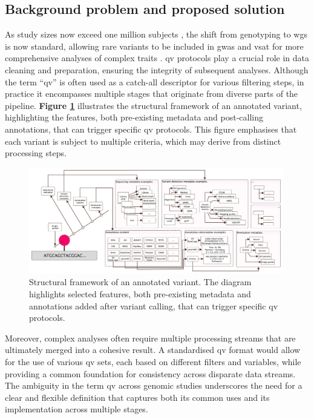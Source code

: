 \subsection{Background problem and proposed solution}

As study sizes now exceed one million subjects \cite{lee2018gene, jansen2019genome}, the shift from genotyping to \ac{wgs} is now standard, allowing rare variants to be included in \ac{gwas} and \ac{vsat} for more comprehensive analyses of complex traits \cite{manolio2009finding, young2019solving}. %
\ac{qv} protocols play a crucial role in data cleaning and preparation, ensuring the integrity of subsequent analyses. Although the term ``\ac{qv}'' is often used as a catch-all descriptor for various filtering steps, in practice it encompasses multiple stages that originate from diverse parts of the pipeline.
\textbf{Figure \ref{fig:qv_structure_vcurrent}} illustrates the structural framework of an annotated variant, highlighting the features, both pre-existing metadata and post-calling annotations, that can trigger specific \ac{qv} protocols. This figure emphasises that each variant is subject to multiple criteria, which may derive from distinct processing steps.

\begin{figure}[h!]
\centering
     \includegraphics[width=0.99\textwidth]{./images/qv_structure_vcurrent.pdf}
\caption{
Structural framework of an annotated variant. The diagram highlights selected features, both pre-existing metadata and annotations added after variant calling, that can trigger specific \ac{qv} protocols.
}
\label{fig:qv_structure_vcurrent}
\end{figure}

Moreover, complex analyses often require multiple processing streams that are ultimately merged into a cohesive result. A standardised \ac{qv} format would allow for the use of various \ac{qv} sets, each based on different filters and variables, while providing a common foundation for consistency across disparate data streams. The ambiguity in the term \ac{qv} across genomic studies underscores the need for a clear and flexible definition that captures both its common uses and its implementation across multiple stages.

